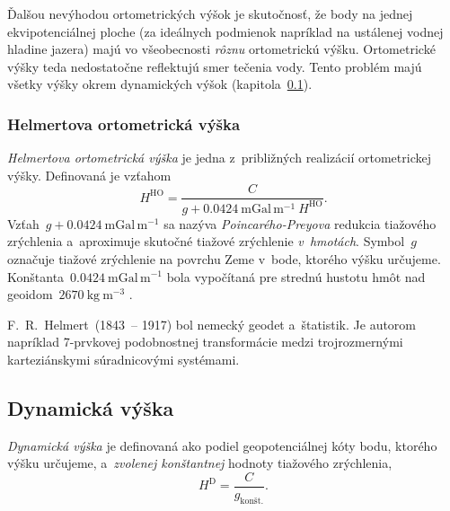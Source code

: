 \documentclass[a4paper, 12pt]{book}
\begin{document}
Ďalšou nevýhodou ortometrických výšok je skutočnosť, že body na jednej 
ekvipotenciálnej ploche (za ideálnych podmienok napríklad na ustálenej vodnej 
hladine jazera) majú vo všeobecnosti \emph{rôznu} ortometrickú výšku.  
Ortometrické výšky teda nedostatočne reflektujú smer tečenia vody.  Tento 
problém majú všetky výšky okrem dynamických výšok 
(kapitola~\ref{sec:dynamic_height}).

\subsubsection{Helmertova ortometrická výška}
\label{sec:helmert_height}

\emph{Helmertova ortometrická výška} je jedna z~približných realizácií 
ortometrickej výšky.  Definovaná je vzťahom
%
\begin{equation}
\label{eq:helmert_height}
H^\mathrm{HO} = \frac{C}{g + 0.0424\ \mathrm{mGal} \, \mathrm{m}^{-1} 
\ H^\mathrm{HO}}{.}
\end{equation}
%
Vzťah~$g + 0.0424\ \mathrm{mGal} \, \mathrm{m}^{-1}$ sa nazýva 
\emph{Poincarého-Preyova} redukcia tiažového zrýchlenia a~aproximuje skutočné 
tiažové zrýchlenie \emph{v~hmotách}.  Symbol~$g$ označuje tiažové zrýchlenie na 
povrchu Zeme v~bode, ktorého výšku určujeme.  Konštanta~$0.0424\ \mathrm{mGal} 
\, \mathrm{m}^{-1}$ bola vypočítaná pre strednú hustotu hmôt nad geoidom~$2670\ 
\mathrm{kg} \ \mathrm{m}^{-3}$ \parencite[pre odvodenie pozri 
napríklad][]{Jekeli2000a,MoritzPhysicalGeodesy,SansoGeodeticHeights}.

F.~R.~Helmert~(1843~-- 1917) bol nemecký geodet a~štatistik.  Je autorom 
napríklad 7-prvkovej podobnostnej transformácie medzi trojrozmernými 
karteziánskymi súradnicovými systémami.

\subsection{Dynamická výška}
\label{sec:dynamic_height}

\emph{Dynamická výška} je definovaná ako podiel geopotenciálnej kóty bodu, 
ktorého výšku určujeme, a~\emph{zvolenej konštantnej} hodnoty tiažového 
zrýchlenia,
%
\begin{equation}
\label{eq:dynamic_height}
H^\mathrm{D} = \frac{C}{g_\textrm{kon\v{s}t.}}{.}
\end{equation}
\end{document}
